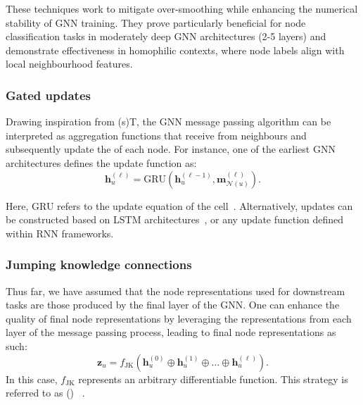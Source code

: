 \medskip
These techniques work to mitigate over-smoothing while enhancing the numerical stability of GNN training. They prove particularly beneficial for node classification tasks in moderately deep GNN architectures (2-5 layers) and demonstrate effectiveness in homophilic contexts, where node labels align with local neighbourhood features.

\subsubsection{Gated updates}
Drawing inspiration from  (s)T, the GNN message passing algorithm can be interpreted as aggregation functions that receive  from neighbours and subsequently update the  of each node. For instance, one of the earliest GNN architectures defines the update function as:
\begin{equation*}
    \mathbf{h}_u^{(\ell)} = \text{GRU}(\mathbf{h}_u^{(\ell-1)}, \mathbf{m}_{\mathcal{N}(u)}^{(\ell)}).
\end{equation*}

Here, GRU refers to the update equation of the  cell~\cite{Cho2014learningPhraseRepresentations}. Alternatively, updates can be constructed based on LSTM architectures~\cite{selsam2018LearningSATSolverSingleBitSupervision}, or any update function defined within RNN frameworks.

\subsubsection{Jumping knowledge connections}
Thus far, we have assumed that the node representations used for downstream tasks are those produced by the final layer of the GNN.  One can enhance the quality of final node representations by leveraging the representations from each layer of the message passing process, leading to final node representations as such:
\begin{equation*}
    \mathbf{z}_u = f_\text{JK}(\mathbf{h}_u^{(0)} \oplus \mathbf{h}_u^{(1)} \oplus ... \oplus \mathbf{h}_u^{(\ell)}).
\end{equation*}
In this case, $ f_\text{JK} $ represents an arbitrary differentiable function. This strategy is referred to as  () ~\cite{xu2018RepresentationLearningGraphsJumpingKnowledgeNetworks}.

